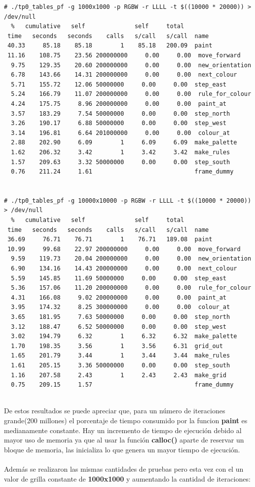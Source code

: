 \documentclass[a4paper, 10pt, twoside, notitlepage]{article}
\begin{document}
\begin{verbatim}
# ./tp0_tables_pf -g 1000x1000 -p RGBW -r LLLL -t $((10000 * 20000)) > /dev/null
  %   cumulative   self              self     total           
 time   seconds   seconds    calls   s/call   s/call  name    
 40.33     85.18    85.18        1    85.18   200.09  paint
 11.16    108.75    23.56 200000000     0.00     0.00  move_forward
  9.75    129.35    20.60 200000000     0.00     0.00  new_orientation
  6.78    143.66    14.31 200000000     0.00     0.00  next_colour
  5.71    155.72    12.06 50000000     0.00     0.00  step_east
  5.24    166.79    11.07 200000000     0.00     0.00  rule_for_colour
  4.24    175.75     8.96 200000000     0.00     0.00  paint_at
  3.57    183.29     7.54 50000000     0.00     0.00  step_north
  3.26    190.17     6.88 50000000     0.00     0.00  step_west
  3.14    196.81     6.64 201000000     0.00     0.00  colour_at
  2.88    202.90     6.09        1     6.09     6.09  make_palette
  1.62    206.32     3.42        1     3.42     3.42  make_rules
  1.57    209.63     3.32 50000000     0.00     0.00  step_south
  0.76    211.24     1.61                             frame_dummy


# ./tp0_tables_pf -g 10000x10000 -p RGBW -r LLLL -t $((10000 * 20000)) > /dev/null
  %   cumulative   self              self     total           
 time   seconds   seconds    calls   s/call   s/call  name    
 36.69     76.71    76.71        1    76.71   189.08  paint
 10.99     99.68    22.97 200000000     0.00     0.00  move_forward
  9.59    119.73    20.04 200000000     0.00     0.00  new_orientation
  6.90    134.16    14.43 200000000     0.00     0.00  next_colour
  5.59    145.85    11.69 50000000     0.00     0.00  step_east
  5.36    157.06    11.20 200000000     0.00     0.00  rule_for_colour
  4.31    166.08     9.02 200000000     0.00     0.00  paint_at
  3.95    174.32     8.25 300000000     0.00     0.00  colour_at
  3.65    181.95     7.63 50000000     0.00     0.00  step_north
  3.12    188.47     6.52 50000000     0.00     0.00  step_west
  3.02    194.79     6.32        1     6.32     6.32  make_palette
  1.70    198.35     3.56        1     3.56     6.31  grid_out
  1.65    201.79     3.44        1     3.44     3.44  make_rules
  1.61    205.15     3.36 50000000     0.00     0.00  step_south
  1.16    207.58     2.43        1     2.43     2.43  make_grid
  0.75    209.15     1.57                             frame_dummy


\end{verbatim}
\normalsize
De estos resultados se puede apreciar que, para un número de iteraciones grande(200 millones) el porcentaje de tiempo consumido por la funcion \textbf{paint} es medianamente constante. Hay un incremento de tiempo de ejecución debido al mayor uso de memoria ya que al usar la función \textbf{calloc()} aparte de reservar un bloque de memoria, las inicializa lo que genera un mayor tiempo de ejecución.\\
\\
Además se realizaron las mismas cantidades de pruebas pero esta vez con el un valor de grilla constante de \textbf{1000x1000} y aumentando la cantidad de iteraciones:
\end{document}
